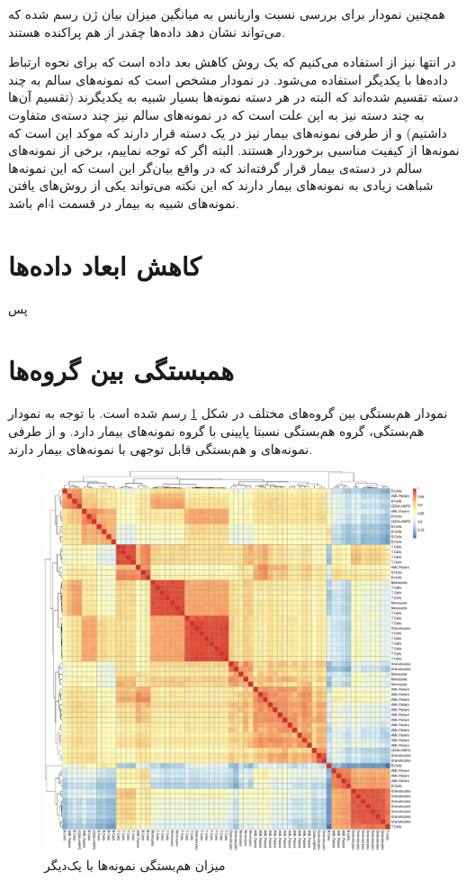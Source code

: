 \documentclass{article}
\begin{document}
همچنین نمودار  برای بررسی نسبت واریانس به میانگین میزان بیان ژن رسم شده که می‌تواند نشان دهد داده‌‌ها چقدر از هم پراکنده هستند.

در انتها نیز از 
استفاده می‌کنیم که یک روش کاهش بعد داده است که برای نحوه ارتباط داده‌ها با یکدیگر استفاده می‌شود. در نمودار مشخص است که نمونه‌های سالم به چند دسته تقسیم شده‌اند که البته در هر دسته نمونه‌ها بسیار شبیه به یکدیگرند (تقسیم آن‌ها به چند دسته نیز به این علت است که در نمونه‌های سالم نیز چند دسته‌ی متفاوت داشتیم) و از طرفی نمونه‌های بیمار نیز در یک دسته قرار دارند که موکد این است که نمونه‌ها از کیفیت مناسبی برخوردار هستند. البته اگر که توجه نماییم، برخی از نمونه‌های سالم در دسته‌ی بیمار قرار گرفته‌اند که در واقع بیان‌گر این است که این نمونه‌ها شباهت زیادی به نمونه‌های بیمار دارند که این نکته می‌تواند یکی از روش‌های یافتن نمونه‌های شبیه به بیمار در قسمت 4‌ام باشد.

\section{کاهش ابعاد داده‌‌ها}
پس
\section{همبستگی بین گروه‌ها}
نمودار هم‌بستگی بین گروه‌های مختلف در شکل \ref{fig:sourcename-cor-heatmap} رسم شده است.
با توجه به نمودار هم‌بستگی، گروه  هم‌بستگی نسبتا پایینی با گروه نمونه‌های بیمار دارد. 
و از طرفی نمونه‌های  و  هم‌بستگی قابل توجهی با نمونه‌های بیمار دارند.

\begin{figure}[h!]
	\centering
	\includegraphics[width=0.8\columnwidth]{figs/SourceName-Cor-Heatmap.pdf}
	\caption{میزان هم‌بستگی نمونه‌ها با یک‌دیگر}
	\label{fig:sourcename-cor-heatmap}
\end{figure}
\end{document}
